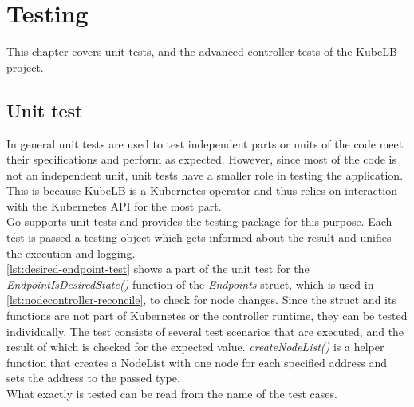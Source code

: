 \chapter{Testing}

This chapter covers unit tests, and the advanced controller tests of the KubeLB project.

\section{Unit test}\label{sec:unit-test}
In general unit tests are used to test independent parts or units of the code meet their specifications and perform as expected.
However, since most of the code is not an independent unit, unit tests have a smaller role in testing the application.
This is because KubeLB is a Kubernetes operator and thus relies on interaction with the Kubernetes API for the most part.
\\
Go supports unit tests and provides the testing package for this purpose.
Each test is passed a testing object which gets informed about the result and unifies the execution and logging.
\\
\autoref{lst:desired-endpoint-test} shows a part of the unit test for the \textit{EndpointIsDesiredState()} function of the \textit{Endpoints} struct, which is used in \autoref{lst:nodecontroller-reconcile}, to check for node changes.
Since the struct and its functions are not part of Kubernetes or the controller runtime, they can be tested individually.
The test consists of several test scenarios that are executed, and the result of which is checked for the expected value.
\textit{createNodeList()} is a helper function that creates a NodeList with one node for each specified address and sets the address to the passed type.
\\
What exactly is tested can be read from the name of the test cases.

